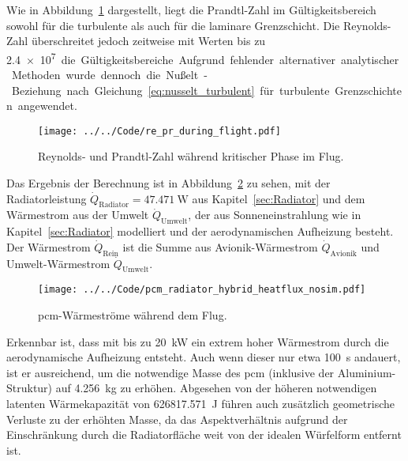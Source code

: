 Wie in Abbildung~\ref{fig:re_pr_flugsimulation} dargestellt, liegt die Prandtl-Zahl im Gültigkeitsbereich sowohl für die turbulente als auch
für die laminare Grenzschicht. Die Reynolds-Zahl überschreitet jedoch zeitweise mit Werten bis zu \SI{2.4e7} die Gültigkeitsbereiche.
Aufgrund fehlender alternativer analytischer Methoden wurde dennoch die Nußelt-Beziehung nach Gleichung~\ref{eq:nusselt_turbulent} für turbulente Grenzschichten angewendet.

\begin{figure}
  \centering
  \texttt{[image: ../../Code/re\_pr\_during\_flight.pdf]}
  \caption{Reynolds- und Prandtl-Zahl während kritischer Phase im Flug.}\label{fig:re_pr_flugsimulation}
\end{figure}

Das Ergebnis der Berechnung ist in Abbildung~\ref{fig:pcm_waermestrom_vorauslegung} zu sehen, mit der Radiatorleistung $\dot{Q}_\mathrm{Radiator} = \SI{47,471}{\watt}$
aus Kapitel~\ref{sec:Radiator} und dem Wärmestrom aus der Umwelt $\dot{Q}_\mathrm{Umwelt}$, der aus Sonneneinstrahlung wie in Kapitel~\ref{sec:Radiator} modelliert
und der aerodynamischen Aufheizung besteht.
Der Wärmestrom $\dot{Q}_\mathrm{Rein}$ ist die Summe aus Avionik-Wärmestrom $\dot{Q}_\mathrm{Avionik}$ und Umwelt-Wärmestrom $\dot{Q}_\mathrm{Umwelt}$.

\begin{figure}[H]
  \centering
  \texttt{[image: ../../Code/pcm\_radiator\_hybrid\_heatflux\_nosim.pdf]}
  \caption{\acs{pcm}-Wärmeströme während dem Flug.}\label{fig:pcm_waermestrom_vorauslegung}
\end{figure}

Erkennbar ist, dass mit bis zu \SI{20}{\kilo\watt} ein extrem hoher Wärmestrom durch die aerodynamische Aufheizung entsteht.
Auch wenn dieser nur etwa \SI{100}{\second} andauert, ist er ausreichend, um die notwendige Masse des \ac{pcm} (inklusive der Aluminium-Struktur)
auf \SI{4,256}{\kilo\gram} zu erhöhen. Abgesehen von der höheren notwendigen latenten Wärmekapazität von \SI{626817,571}{\joule} führen auch zusätzlich geometrische
Verluste zu der erhöhten Masse, da das Aspektverhältnis aufgrund der Einschränkung durch die Radiatorfläche weit von der idealen Würfelform entfernt ist.